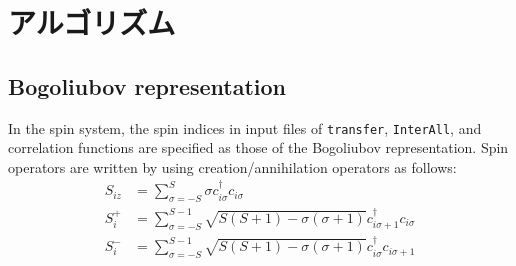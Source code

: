 \chapter{アルゴリズム}
\label{Ch:algorithm}

\section{Bogoliubov representation}\label{sec_bogoliubov_rep}

In the spin system,
the spin indices in input files of \verb|transfer|, \verb|InterAll|,
and correlation functions are specified as those of the Bogoliubov representation.
Spin operators are written by using creation/annihilation operators as follows:
\begin{align}
  S_{i z} &= \sum_{\sigma = -S}^{S} \sigma c_{i \sigma}^\dagger c_{i \sigma}
  \\
  S_{i}^+ &= \sum_{\sigma = -S}^{S-1} 
  \sqrt{S(S+1) - \sigma(\sigma+1)} 
  c_{i \sigma+1}^\dagger c_{i \sigma}
  \\
  S_{i}^- &= \sum_{\sigma = -S}^{S-1} 
  \sqrt{S(S+1) - \sigma(\sigma+1)} 
  c_{i \sigma}^\dagger c_{i \sigma+1}
\end{align}

